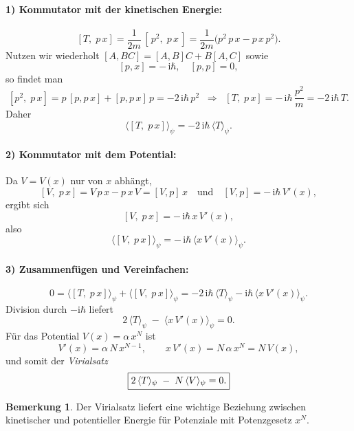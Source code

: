 \documentclass[a4paper,11pt]{article}
\theoremstyle{definition}
\newtheorem*{remark}{Bemerkung}
\begin{document}
\paragraph{1) Kommutator mit der kinetischen Energie:}
\[
[T,\;p\,x]
= \frac{1}{2m}\,[\,p^2,\;p\,x\,]
= \frac{1}{2m}\bigl(p^2\,p\,x - p\,x\,p^2\bigr).
\]
Nutzen wir wiederholt $[A,BC]=[A,B]C + B[A,C]$ sowie
\[
[p,x] = -\,\mathrm{i}\hbar,
\quad
[p,p]=0,
\]
so findet man
\[
[p^2,\;p\,x]
= p\,[p,p\,x] + [p,p\,x]\,p
= -2\,\mathrm{i}\hbar\,p^2
\;\;\Longrightarrow\;\;
[T,\;p\,x]
= -\,\mathrm{i}\hbar\,\frac{p^2}{m}
= -2\,\mathrm{i}\hbar\,T.
\]
Daher
\[
\bigl\langle [T,\;p\,x]\bigr\rangle_\psi
= -2\,\mathrm{i}\hbar\,\langle T\rangle_\psi.
\]

\paragraph{2) Kommutator mit dem Potential:}
Da $V=V(x)$ nur von $x$ abhängt,
\[
[V,\;p\,x]
= V\,p\,x - p\,x\,V
= [V,p]\,x
\quad\text{und}\quad
[V,p] = -\,\mathrm{i}\hbar\,V'(x),
\]
ergibt sich
\[
[V,\;p\,x]
= -\,\mathrm{i}\hbar\,x\,V'(x),
\]
also
\[
\bigl\langle [V,\;p\,x]\bigr\rangle_\psi
= -\,\mathrm{i}\hbar\,\bigl\langle x\,V'(x)\bigr\rangle_\psi.
\]

\paragraph{3) Zusammenfügen und Vereinfachen:}
\[
0
= \bigl\langle [T,\;p\,x]\bigr\rangle_\psi
+ \bigl\langle [V,\;p\,x]\bigr\rangle_\psi
= -2\,\mathrm{i}\hbar\,\langle T\rangle_\psi
  - \mathrm{i}\hbar\,\langle x\,V'(x)\rangle_\psi.
\]
Division durch $-\mathrm{i}\hbar$ liefert
\[
2\,\langle T\rangle_\psi
\;-\;
\bigl\langle x\,V'(x)\bigr\rangle_\psi
= 0.
\]
Für das Potential $V(x)=\alpha\,x^N$ ist
\[
V'(x) = \alpha\,N\,x^{N-1},
\qquad
x\,V'(x) = N\,\alpha\,x^N = N\,V(x),
\]
und somit der \emph{Virialsatz}
\[
\boxed{%
2\,\langle T\rangle_\psi
\;-\;
N\,\langle V\rangle_\psi
=0.
}
\]

\begin{remark}
Der Virialsatz liefert eine wichtige Beziehung zwischen kinetischer und potentieller Energie
für Potenziale mit Potenzgesetz $x^N$.
\end{remark}
\end{document}
